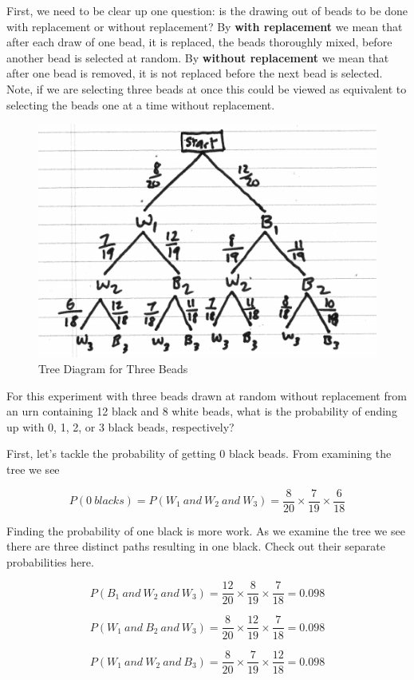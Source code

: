 \documentclass[]{book}
\theoremstyle{definition}
\theoremstyle{definition}
\theoremstyle{definition}
\theoremstyle{remark}
\begin{document}
First, we need to be clear up one question: is the drawing out of beads
to be done with replacement or without replacement? By \textbf{with
replacement} we mean that after each draw of one bead, it is replaced,
the beads thoroughly mixed, before another bead is selected at random.
By \textbf{without replacement} we mean that after one bead is removed,
it is not replaced before the next bead is selected. Note, if we are
selecting three beads at once this could be viewed as equivalent to
selecting the beads one at a time without replacement.

\begin{figure}

{\centering \includegraphics[width=0.6\linewidth]{01-basics-figures/tree_urn1} 

}

\caption{Tree Diagram for Three Beads}\label{fig:nice-fig-37}
\end{figure}

For this experiment with three beads drawn at random without replacement
from an urn containing 12 black and 8 white beads, what is the
probability of ending up with 0, 1, 2, or 3 black beads, respectively?

First, let's tackle the probability of getting 0 black beads. From
examining the tree we see

\[P(0\ blacks) = P(W_{1}\ and\ W_{2}\ and\ W_{3}) = \frac{8}{20} \times \frac{7}{19} \times \frac{6}{18}\]

Finding the probability of one black is more work. As we examine the
tree we see there are three distinct paths resulting in one black. Check
out their separate probabilities here.

\[P(B_{1}\ and\ W_{2}\ and\ W_{3}) = \frac{12}{20} \times \frac{8}{19} \times \frac{7}{18} = 0.098\]

\[P(W_{1}\ and\ B_{2}\ and\ W_{3}) = \frac{8}{20} \times \frac{12}{19} \times \frac{7}{18} = 0.098\]

\[P(W_{1}\ and\ W_{2}\ and\ B_{3}) = \frac{8}{20} \times \frac{7}{19} \times \frac{12}{18} = 0.098\]
\end{document}
